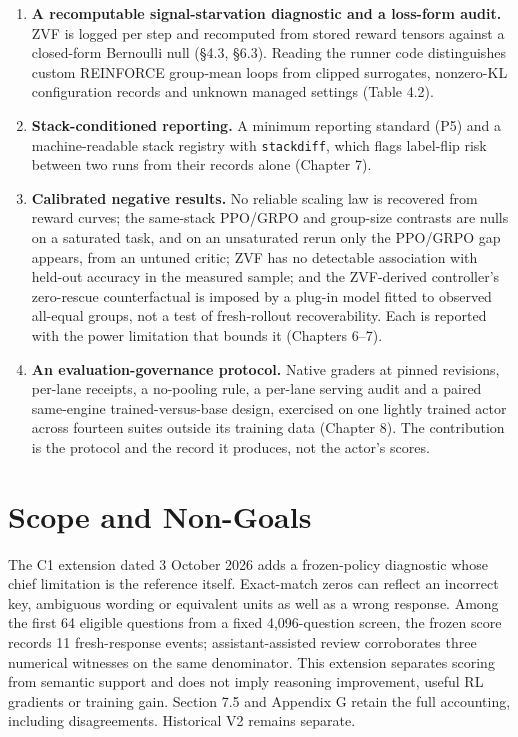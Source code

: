 \documentclass[12pt,a4paper]{report}
\providecommand{\tightlist}{%
  \setlength{\itemsep}{0pt}\setlength{\parskip}{0pt}}
\begin{document}
\begin{enumerate}
\def\labelenumi{\arabic{enumi}.}
\tightlist
\item
  \textbf{A recomputable signal-starvation diagnostic and a loss-form
  audit.} ZVF is logged per step and recomputed from stored reward
  tensors against a closed-form Bernoulli null (§4.3, §6.3). Reading the
  runner code distinguishes custom REINFORCE group-mean loops from
  clipped surrogates, nonzero-KL configuration records and unknown
  managed settings (Table 4.2).
\item
  \textbf{Stack-conditioned reporting.} A minimum reporting standard
  (P5) and a machine-readable stack registry with \texttt{stackdiff},
  which flags label-flip risk between two runs from their records alone
  (Chapter 7).
\item
  \textbf{Calibrated negative results.} No reliable scaling law is
  recovered from reward curves; the same-stack PPO/GRPO and group-size
  contrasts are nulls on a saturated task, and on an unsaturated rerun
  only the PPO/GRPO gap appears, from an untuned critic; ZVF has no
  detectable association with held-out accuracy in the measured sample;
  and the ZVF-derived controller's zero-rescue counterfactual is imposed
  by a plug-in model fitted to observed all-equal groups, not a test of
  fresh-rollout recoverability. Each is reported with the power
  limitation that bounds it (Chapters 6--7).
\item
  \textbf{An evaluation-governance protocol.} Native graders at pinned
  revisions, per-lane receipts, a no-pooling rule, a per-lane serving
  audit and a paired same-engine trained-versus-base design, exercised
  on one lightly trained actor across fourteen suites outside its
  training data (Chapter 8). The contribution is the protocol and the
  record it produces, not the actor's scores.
\end{enumerate}

\section{Scope and Non-Goals}\label{scope-and-non-goals}

The C1 extension dated 3 October 2026 adds a frozen-policy diagnostic
whose chief limitation is the reference itself. Exact-match zeros can
reflect an incorrect key, ambiguous wording or equivalent units as well
as a wrong response. Among the first 64 eligible questions from a fixed
4,096-question screen, the frozen score records 11 fresh-response
events; assistant-assisted review corroborates three numerical witnesses
on the same denominator. This extension separates scoring from semantic
support and does not imply reasoning improvement, useful RL gradients or
training gain. Section 7.5 and Appendix G retain the full accounting,
including disagreements. Historical V2 remains separate.
\end{document}
